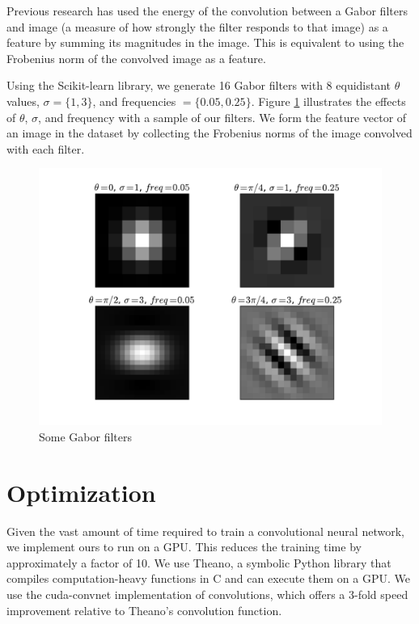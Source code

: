 \documentclass{acm_proc_article-sp}
\begin{document}
Previous research has used the energy of the convolution between a Gabor filters and image (a measure of how strongly the filter responds to that image\cite{Grigorescu}) as a feature by summing its magnitudes in the image.\cite{Bau} This is equivalent to using the Frobenius norm of the convolved image as a feature. 

Using the Scikit-learn library\cite{scikit-learn}, we generate 16 Gabor filters with 8 equidistant $\theta$ values, $\sigma = \{1, 3\}$, and frequencies $= \{0.05, 0.25\}$. Figure \ref{fig:gabor} illustrates the effects of $\theta$, $\sigma$, and frequency with a sample of our filters. We form the feature vector of an image in the dataset by collecting the Frobenius norms of the image convolved with each filter. 

\begin{figure}[h]
	\centering
	\includegraphics[width=\linewidth]{gabors}
  	\caption{Some Gabor filters}
  	\label{fig:gabor}
\end{figure}



\section{Optimization} 
Given the vast amount of time required to train a convolutional neural network, we implement ours to run on a GPU. This reduces the training time by approximately a factor of 10. We use Theano\cite{Theano}, a symbolic Python library that compiles computation-heavy functions in C and can execute them on a GPU. We use the cuda-convnet implementation of convolutions\cite{Krizhevsky}, which offers a 3-fold speed improvement relative to Theano's convolution function.
\end{document}
